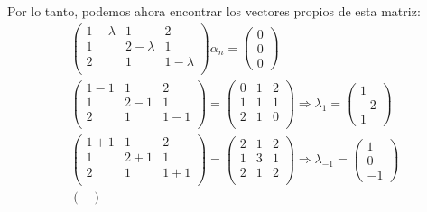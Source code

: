 \documentclass[12pt]{exam}
\begin{document}
\begin{enumerate}
\begin{enumerate}
    Por lo tanto, podemos ahora encontrar los vectores propios de esta matriz:
    \begin{align*}
        \begin{pmatrix} 
            1 - \lambda & 1 & 2 \\
            1 & 2 - \lambda & 1 \\
            2 & 1 & 1 - \lambda \\
        \end{pmatrix} \alpha_n = \begin{pmatrix} 0 \\ 0 \\ 0 \end{pmatrix} \\
        \begin{pmatrix} 
            1 - 1 & 1 & 2 \\
            1 & 2 - 1 & 1 \\
            2 & 1 & 1 - 1\\
        \end{pmatrix} =  \begin{pmatrix} 
            0 & 1 & 2 \\
            1 & 1 & 1 \\
            2 & 1 & 0 \\
        \end{pmatrix} \Rightarrow \lambda_1 = \begin{pmatrix} 1 \\ -2 \\ 1 \end{pmatrix} \\
        \begin{pmatrix} 
            1 + 1 & 1 & 2 \\
            1 & 2 + 1 & 1 \\
            2 & 1 & 1 + 1\\
        \end{pmatrix} =  \begin{pmatrix} 
            2 & 1 & 2 \\
            1 & 3 & 1 \\
            2 & 1 & 2 \\
            \end{pmatrix} \Rightarrow \lambda_{-1} = \begin{pmatrix} 1 \\ 0 \\ -1 \end{pmatrix} \\
        \begin{pmatrix} 

\end{pmatrix}
\end{align*}
\end{enumerate}
\end{enumerate}
\end{document}
